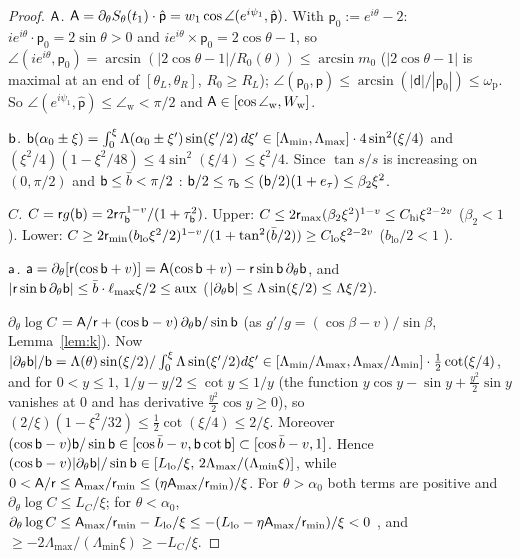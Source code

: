 \begin{proof}
\emph{$\mathsf A$.} $\mathsf A=\partial_\theta S_\theta(t_1)\cdot\hat{\mathsf p}=w_1\cos\angle(e^{i\psi_1},\hat{\mathsf p})$. With
$\mathsf p_0:=e^{i\theta}-2$: $ie^{i\theta}\cdot\mathsf p_0=2\sin\theta>0$ and $ie^{i\theta}\times\mathsf p_0=2\cos\theta-1$, so
$\angle(ie^{i\theta},\mathsf p_0)=\arcsin(|2\cos\theta-1|/R_0(\theta))\le\arcsin m_0$ ($|2\cos\theta-1|$ is maximal at an end of
$[\theta_L,\theta_R]$, $R_0\ge R_L$); $\angle(\mathsf p_0,\mathsf p)\le\arcsin(|\mathsf d|/|\mathsf p_0|)\le\omega_{\mathrm p}$. So
$\angle(e^{i\psi_1},\hat{\mathsf p})\le\angle_{\mathrm w}<\pi/2$  and $\mathsf A\in[\cos\angle_{\mathrm w},W_{\mathrm w}]$.

\emph{$\mathsf b$.} $\mathsf b(\alpha_0\pm\xi)=\int_0^\xi\Lambda(\alpha_0\pm\xi')\sin(\xi'/2)\,d\xi'\in[\Lambda_{\min},\Lambda_{\max}]\cdot4\sin^2(\xi/4)$
and $(\xi^2/4)(1-\xi^2/48)\le4\sin^2(\xi/4)\le\xi^2/4$. Since $\tan s/s$ is increasing on $(0,\pi/2)$ and $\mathsf b\le\bar b<\pi/2$
: $\mathsf b/2\le\tau_{\mathsf b}\le(\mathsf b/2)(1+e_\tau)\le\beta_2\xi^2$.

\emph{$C$.} $C=\mathsf r g(\mathsf b)=2\mathsf r\tau_{\mathsf b}^{1-v}/(1+\tau_{\mathsf b}^2)$. Upper: $C\le2\mathsf r_{\max}(\beta_2\xi^2)^{1-v}\le C_{\mathrm{hi}}\xi^{2-2v}$
($\beta_2<1$ ). Lower: $C\ge2\mathsf r_{\min}(b_{\mathrm{lo}}\xi^2/2)^{1-v}/(1+\tan^2(\bar b/2))\ge C_{\mathrm{lo}}\xi^{2-2v}$
($b_{\mathrm{lo}}/2<1$ ).

\emph{$\mathsf a$.} $\mathsf a=\partial_\theta[\mathsf r(\cos\mathsf b+v)]=\mathsf A(\cos\mathsf b+v)-\mathsf r\sin\mathsf b\,\partial_\theta\mathsf b$, and
$|\mathsf r\sin\mathsf b\,\partial_\theta\mathsf b|\le\bar b\cdot\ell_{\max}\xi/2\le\mathrm{aux}$ ($|\partial_\theta\mathsf b|\le\Lambda\sin(\xi/2)\le\Lambda\xi/2$).

\emph{$\partial_\theta\log C$} $=\mathsf A/\mathsf r+(\cos\mathsf b-v)\,\partial_\theta\mathsf b/\sin\mathsf b$ (as $g'/g=(\cos\beta-v)/\sin\beta$,
Lemma~\ref{lem:k}). Now $|\partial_\theta\mathsf b|/\mathsf b=\Lambda(\theta)\sin(\xi/2)/\int_0^\xi\Lambda\sin(\xi'/2)d\xi'\in
[\Lambda_{\min}/\Lambda_{\max},\Lambda_{\max}/\Lambda_{\min}]\cdot\frac12\cot(\xi/4)$, and for $0<y\le1$, $1/y-y/2\le\cot y\le1/y$ (the
function $y\cos y-\sin y+\frac{y^2}2\sin y$ vanishes at $0$ and has derivative $\frac{y^2}2\cos y\ge0$), so
$(2/\xi)(1-\xi^2/32)\le\frac12\cot(\xi/4)\le2/\xi$. Moreover $(\cos\mathsf b-v)\mathsf b/\sin\mathsf b\in[\cos\bar b-v,\mathsf b\cot\mathsf b]\subset
[\cos\bar b-v,1]$. Hence $(\cos\mathsf b-v)|\partial_\theta\mathsf b|/\sin\mathsf b\in[L_{\mathrm{lo}}/\xi,\,2\Lambda_{\max}/(\Lambda_{\min}\xi)]$, while
$0<\mathsf A/\mathsf r\le\mathsf A_{\max}/\mathsf r_{\min}\le(\eta\mathsf A_{\max}/\mathsf r_{\min})/\xi$. For $\theta>\alpha_0$ both terms are positive and
$\partial_\theta\log C\le L_C/\xi$; for $\theta<\alpha_0$, $\partial_\theta\log C\le\mathsf A_{\max}/\mathsf r_{\min}-L_{\mathrm{lo}}/\xi\le
-(L_{\mathrm{lo}}-\eta\mathsf A_{\max}/\mathsf r_{\min})/\xi<0$ , and $\ge-2\Lambda_{\max}/(\Lambda_{\min}\xi)\ge-L_C/\xi$.


\end{proof}
